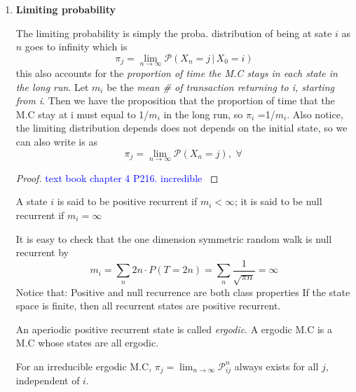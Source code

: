 \documentclass[10.5pt]{article}
\newcommand*\circled[1]{\tikz[baseline=(char.base)]{
            \node[shape=circle,draw,inner sep=2pt] (char) {#1};}}
\newcommand{\prob}[0]{\mathcal{P}}
\newcommand{\hilight}[1]{\colorbox{orange!20}{#1}}
\newenvironment{changemargin}[2]{%
  \begin{list}{}{%
    \setlength{\topsep}{0pt}%
    \setlength{\leftmargin}{#1}%
    \setlength{\rightmargin}{#2}%
    \setlength{\listparindent}{\parindent}%
    \setlength{\itemindent}{\parindent}%
    \setlength{\parsep}{\parskip}%
  }%
  \item[]}{\end{list}}
\begin{document}
\begin{changemargin}{-0.125in}{0in}
\begin{enumerate}
      
      
      \item \textbf{Limiting probability}
      
      \smallskip
      
      The limiting probability is simply the proba. distribution of being at sate $i$ as $n$ goes to infinity which is 
      \[
      \pi_j = \lim_{n \rightarrow \infty} \mathcal{P}(X_n = j\,|\, X_0 = i)
      \]
      this also accounts for the \textit{proportion of time the M.C stays in each state in the long run}. Let $m_i$ be the \textit{mean \# of transaction returning to i, starting from i}. Then we have the proposition that the \hilight{proportion of time that the M.C stay at i must equal to 1/$m_i$ in the long run, so $\pi_i$ =1/$m_i$.} Also notice, the limiting distribution depends does not depends on the initial state, so we can also write is as 
      \[
      \pi_j = \lim_{n \rightarrow \infty} \prob(X_n = j),\,\,\forall \,  
      \]
      
      \begin{proof}
      	\textcolor{blue}{text book chapter 4 P216. incredible }
      \end{proof}
      
      \begin{definition}
    		A state $i$ is said to be positive recurrent if $m_i < \infty$; it is said to be null recurrent if $m_i = \infty$
    	\end{definition}
    	
    	It is easy to check that the one dimension symmetric random walk is null recurrent by 
    	\[
    	m_i = \sum_{n} 2n \cdot P(T = 2n) = \sum_{n} \frac{1}{\sqrt{\pi n}} = \infty
    	\]
        Notice that: \circled{1} Positive and null recurrence are both class properties \circled{2} If the state space is finite, then all recurrent states are positive recurrent. 
        
        \begin{definition}
        	An aperiodic positive recurrent state is called \textit{ergodic}. A ergodic M.C is a M.C whose states are all ergodic.
        \end{definition}
      
        \begin{theorem}
        For an irreducible ergodic M.C, $\pi_{j} = \lim_{n\rightarrow \infty} \prob_{ij}^n$ always exists for all $j$, independent of $i$.
        \end{theorem}


\end{enumerate}
\end{changemargin}
\end{document}
